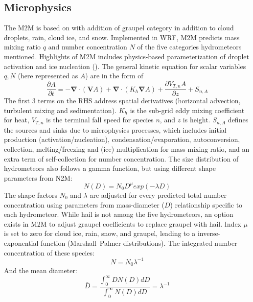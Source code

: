 \subsection{Microphysics}
The M2M is based on \cite{morrison2005new} with addition of graupel category in addition to cloud droplets, rain, cloud ice, and snow. Implemented in WRF, M2M predicts mass mixing ratio $q$ and number concentration $N$ of the five categories hydrometeors mentioned. Highlights of M2M includes physics-based parameterization of droplet activation and ice nucleation (\cite{morrison2005new}). The general kinetic equation for scalar variables $q,N$ (here represented as $A$) are in the form of 
\begin{equation}
    \frac{\partial A}{\partial t} = 
    -\bm{\nabla}\cdot(\bm{V}A)
    +\bm{\nabla}\cdot(K_h\bm{\nabla} A)
    +\frac{\partial V_{T,n}A}{\partial z}
    +S_{n,A}
\end{equation}
The first 3 terms on the RHS address spatial derivatives (horizontal advection, turbulent mixing and sedimentation). $K_h$ is the sub-grid eddy mixing coefficient for heat, $V_{T,n}$ is the terminal fall speed for species $n$, and $z$ is height. $S_{n,A}$ defines the sources and sinks due to microphysics processes, which includes initial production (activation/nucleation), condensation/evaporation, autoconversion, collection, melting/freezing and (ice) multiplication for mass mixing ratio, and an extra term of self-collection for number concentration. The size distribution of hydrometeors also follows a gamma function, but using different shape parameters from N2M:
\begin{equation}
    N(D) = 
    N_0 D^{\mu}
    exp(-\lambda D)
\end{equation}
The shape factors $N_0$ and $\lambda$ are adjusted for every predicted total number concentration using parameters from mass-diameter ($D$) relationship specific to each hydrometeor. While hail is not among the five hydrometeors, an option exists in M2M to adjust graupel coefficients to replace graupel with hail. Index $\mu$ is set to zero for cloud ice, rain, snow, and graupel, leading to a inverse-exponential function (Marshall–Palmer distributions). The integrated number concentration of these species:
\begin{equation}
    N = N_0 \lambda^{-1}
    \label{eq:MP_distr}
\end{equation}
And the mean diameter:
\begin{equation}
    \bar{D} = 
    \frac{\int_0^{\infty} D N(D) dD} {\int_0^{\infty} N(D) dD}
    = \lambda^{-1}
\end{equation}
